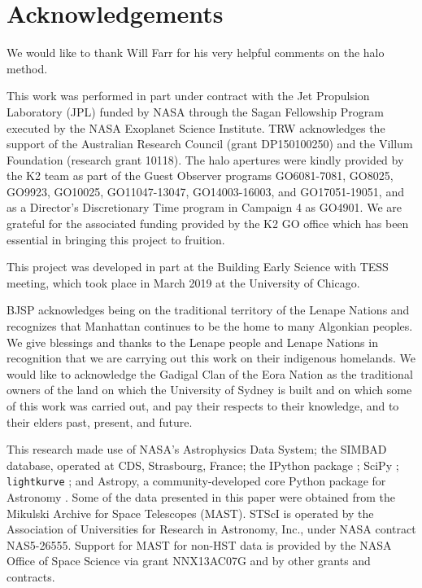 \documentclass[modern]{aastex62}
\begin{document}
\section*{Acknowledgements} %

We would like to thank Will Farr for his very helpful comments on the halo method.

This work was performed in part under contract with the Jet Propulsion Laboratory (JPL) funded by NASA through the Sagan Fellowship Program executed by the NASA Exoplanet Science Institute. TRW acknowledges the support of the Australian Research Council (grant DP150100250) and the Villum Foundation (research grant 10118). The halo apertures were kindly provided by the K2 team as part of the Guest Observer programs GO6081-7081, GO8025, GO9923, GO10025, GO11047-13047, GO14003-16003, and GO17051-19051, and as a Director's Discretionary Time program in Campaign 4 as GO4901. We are grateful for the associated funding provided by the K2 GO office which has been essential in bringing this project to fruition.

This project was developed in part at the Building Early Science with TESS meeting, which took place in March 2019 at the University of Chicago.

BJSP acknowledges being on the traditional territory of the Lenape Nations and recognizes that Manhattan continues to be the home to many Algonkian peoples. We give blessings and thanks to the Lenape people and Lenape Nations in recognition that we are carrying out this work on their indigenous homelands. We would like to acknowledge the Gadigal Clan of the Eora Nation as the traditional owners of the land on which the University of Sydney is built and on which some of this work was carried out, and pay their respects to their knowledge, and to their elders past, present, and future.
%

This research made use of NASA's Astrophysics Data System; the SIMBAD database, operated at CDS, Strasbourg, France; the IPython package \citep{PER-GRA:2007}; SciPy \citep{scipy}; \texttt{lightkurve} \citep{lightkurve}; and Astropy, a community-developed core Python package for Astronomy \citep{astropy}. Some of the data presented in this paper were obtained from the Mikulski Archive for Space Telescopes (MAST). STScI is operated by the Association of Universities for Research in Astronomy, Inc., under NASA contract NAS5-26555. Support for MAST for non-HST data is provided by the NASA Office of Space Science via grant NNX13AC07G and by other grants and contracts. 
\end{document}

